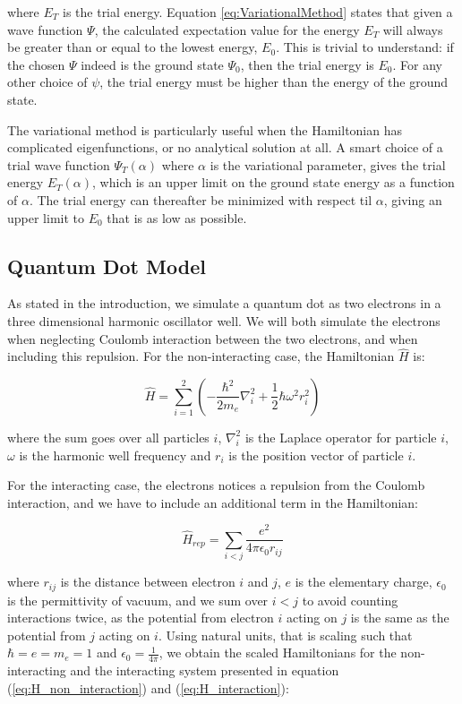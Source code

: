 \documentclass[norsk,a4paper,12pt]{article}
\begin{document}
where $E_T$ is the trial energy. 
Equation \ref{eq:VariationalMethod} states that given a wave function $\Psi$, the calculated expectation value for the energy $E_T$ will always be greater than or equal to the lowest energy, $E_0$. This is trivial to understand: if the chosen $\Psi$ indeed is the ground state $\Psi_0$, then the trial energy is $E_0$. For any other choice of $\psi$, the trial  energy must be higher than the energy of the ground state. \par 
The variational method is particularly useful when the Hamiltonian has complicated eigenfunctions, or no analytical solution at all. A smart choice of a trial wave function $\Psi_T(\alpha)$ where $\alpha$ is the variational parameter, gives the trial energy $E_T(\alpha)$, which is an upper limit on the ground state energy as a function of $\alpha$. The trial energy can thereafter be minimized with respect til $\alpha$, giving an upper limit to $E_0$ that is as low as possible.

\subsection{Quantum Dot Model}
As stated in the introduction, we simulate a quantum dot as two electrons in a three dimensional harmonic oscillator well. We will both simulate the electrons when neglecting Coulomb interaction between the two electrons, and when including this repulsion. For the non-interacting case, the Hamiltonian $\hat{H}$ is:

\begin{equation}
    \hat{H} = \sum_{i=1}^{2} (-\frac{\hbar^2}{2 m_e}\nabla_i^2 + \frac{1}{2}\hbar \omega^2r_i^2) 
    \label{eq:H_non_interaction_unit}
\end{equation}

where the sum goes over all particles $i$, $\nabla_i^2$ is the Laplace operator for particle $i$, $\omega$ is the harmonic well frequency and $r_i$ is the position vector of particle $i$. 

For the interacting case, the electrons notices a repulsion from the Coulomb interaction, and we have to include an additional term in the Hamiltonian:

\begin{equation}
    \hat{H}_{rep} = \sum_{i<j} \frac{e^2}{4\pi \epsilon_0 r_{ij}}
    \label{eq:H_interaction_unit}
\end{equation}

where $r_{ij}$ is the distance between electron $i$ and $j$, $e$ is the elementary charge, $\epsilon_ 0$ is the permittivity of vacuum, and we sum over $i < j$ to avoid counting interactions twice, as the potential from electron $i$ acting on $j$ is the same as the potential from $j$ acting on $i$. Using natural units, that is scaling such that $\hbar = e = m_e = 1$ and $\epsilon_0 = \frac{1}{4\pi}$, we obtain the scaled Hamiltonians for the non-interacting and the interacting system presented in equation (\ref{eq:H_non_interaction}) and (\ref{eq:H_interaction}):
\end{document}

